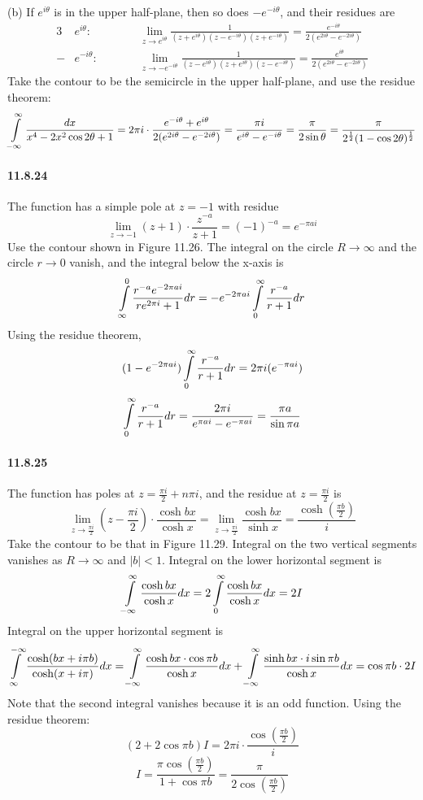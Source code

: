 \documentclass[a4paper]{article}
\begin{document}
(b)
If $e^{i\theta}$ is in the upper half-plane, then so does $-e^{-i\theta}$, and their residues are
\begin{alignat*}{3}
    & e^{i\theta}:\qquad && \lim_{z\to e^{i\theta}}\frac{1}{(z+e^{i\theta})(z-e^{-i\theta})(z+e^{-i\theta})}=\frac{e^{-i\theta}}{2(e^{2i\theta}-e^{-2i\theta})}\\
    - & e^{-i\theta}:\qquad && \lim_{z\to -e^{-i\theta}}\frac{1}{(z-e^{i\theta})(z+e^{i\theta})(z-e^{-i\theta})}=\frac{e^{i\theta}}{2(e^{2i\theta}-e^{-2i\theta})}
\end{alignat*}
Take the contour to be the semicircle in the upper half-plane, and use the residue theorem: 
\[
\int\displaylimits_{-\infty}^\infty\frac{dx}{x^4-2x^2\cos2\theta+1}=2\pi i\cdot\frac{e^{-i\theta}+e^{i\theta}}{2(e^{2i\theta}-e^{-2i\theta})}=\frac{\pi i}{e^{i\theta}-e^{-i\theta}}=\frac{\pi}{2\sin\theta}=\frac{\pi}{2^{\frac{1}{2}}(1-\cos2\theta)^{\frac{1}{2}}}
\]

\paragraph{11.8.24}
The function has a simple pole at $z=-1$ with residue
\[
\lim_{z\to-1}(z+1)\cdot\frac{z^{-a}}{z+1}=(-1)^{-a}=e^{-\pi ai}
\]
Use the contour shown in Figure 11.26. The integral on the circle $R\to\infty$ and the circle $r\to0$ vanish, and the integral below the x-axis is
\[
\int\displaylimits_{\infty}^0\frac{r^{-a}e^{-2\pi ai}}{re^{2\pi i}+1}dr=-e^{-2\pi ai}\int\displaylimits_{0}^\infty\frac{r^{-a}}{r+1}dr
\]
Using the residue theorem,
\[
(1-e^{-2\pi ai})\int\displaylimits_{0}^\infty\frac{r^{-a}}{r+1}dr=2\pi i(e^{-\pi ai})
\]
\[
\int\displaylimits_0^\infty\frac{r^{-a}}{r+1}dr=\frac{2\pi i}{e^{\pi ai}-e^{-\pi ai}}=\frac{\pi a}{\sin\pi a}
\]

\paragraph{11.8.25}
The function has poles at $z=\frac{\pi i}{2}+n\pi i$, and the residue at $z=\frac{\pi i}{2}$ is
\[
\lim_{z\to\frac{\pi i}{2}}(z-\frac{\pi i}{2})\cdot\frac{\cosh bx}{\cosh x}=\lim_{z\to\frac{\pi i}{2}}\frac{\cosh bx}{\sinh x}=\frac{\cosh(\frac{\pi b}{2})}{i}
\]
Take the contour to be that in Figure 11.29. Integral on the two vertical segments vanishes as $R\to\infty$ and  $|b|<1$. Integral on the lower horizontal segment is
\[
\int\displaylimits_{-\infty}^\infty\frac{\cosh bx}{\cosh x}dx=2\int\displaylimits_{0}^\infty\frac{\cosh bx}{\cosh x}dx=2I
\]
Integral on the upper horizontal segment is
\[
\int\displaylimits_{\infty}^{-\infty}\frac{\cosh(bx+i\pi b)}{\cosh(x+i\pi)}dx=\int\displaylimits_{-\infty}^\infty\frac{\cosh bx\cdot\cos\pi b}{\cosh x}dx+\int\displaylimits_{-\infty}^\infty\frac{\sinh bx\cdot i\sin\pi b}{\cosh x}dx=\cos\pi b\cdot2I
\]
Note that the second integral vanishes because it is an odd function. Using the residue theorem:
\[
(2+2\cos\pi b)I=2\pi i\cdot\frac{\cos(\frac{\pi b}{2})}{i}
\]
\[
I=\frac{\pi\cos(\frac{\pi b}{2})}{1+\cos\pi b}=\frac{\pi}{2\cos(\frac{\pi b}{2})}
\]
\end{document}
